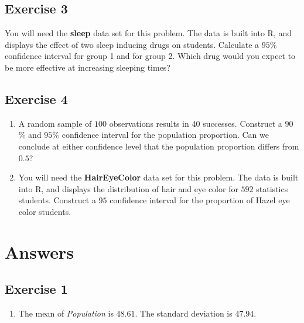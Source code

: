 \documentclass[
  letterpaper,
  DIV=11,
  numbers=noendperiod]{scrreprt}
\providecommand{\tightlist}{%
  \setlength{\itemsep}{0pt}\setlength{\parskip}{0pt}}\usepackage{longtable,booktabs,array}
\begin{document}
\hypertarget{exercise-3-22}{%
\subsection*{Exercise 3}\label{exercise-3-22}}

You will need the \textbf{sleep} data set for this problem. The data is
built into R, and displays the effect of two sleep inducing drugs on
students. Calculate a \(95\)\% confidence interval for group 1 and for
group 2. Which drug would you expect to be more effective at increasing
sleeping times?

\hypertarget{exercise-4-10}{%
\subsection*{Exercise 4}\label{exercise-4-10}}

\begin{enumerate}
\def\labelenumi{\arabic{enumi}.}
\item
  A random sample of \(100\) observations results in \(40\) successes.
  Construct a \(90\)\% and \(95\)\% confidence interval for the
  population proportion. Can we conclude at either confidence level that
  the population proportion differs from \(0.5\)?
\item
  You will need the \textbf{HairEyeColor} data set for this problem. The
  data is built into R, and displays the distribution of hair and eye
  color for \(592\) statistics students. Construct a \(95\) confidence
  interval for the proportion of Hazel eye color students.
\end{enumerate}

\hypertarget{answers-11}{%
\section{Answers}\label{answers-11}}

\hypertarget{exercise-1-23}{%
\subsection*{Exercise 1}\label{exercise-1-23}}

\begin{enumerate}
\def\labelenumi{\arabic{enumi}.}
\tightlist
\item
  The mean of \emph{Population} is \(48.61\). The standard deviation is
  \(47.94\).
\end{enumerate}
\end{document}
